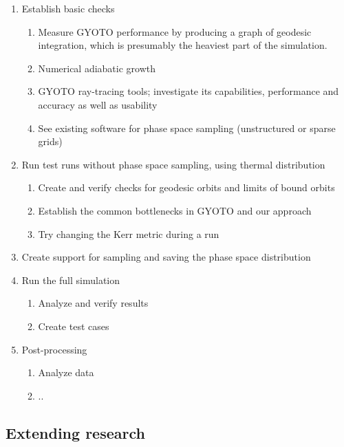 \documentclass[a4paper,10pt]{article}
\begin{document}
\begin{enumerate}
 \item Establish basic checks
 \begin{enumerate}
  \item Measure GYOTO performance by producing a graph of geodesic integration, which is presumably the heaviest part of the simulation.
  \item Numerical adiabatic growth \citep{Sadeghian_Ferrer_Will_2013}
  \item GYOTO ray-tracing tools; investigate its capabilities, performance and accuracy as well as usability
  \item See existing software for phase space sampling (unstructured or sparse grids)
 \end{enumerate}
 \item Run test runs without phase space sampling, using thermal distribution
 \begin{enumerate}
  \item Create and verify checks for geodesic orbits and limits of bound orbits
  \item Establish the common bottlenecks in GYOTO and our approach
  \item Try changing the Kerr metric during a run
 \end{enumerate}
 \item Create support for sampling and saving the phase space distribution
 \item Run the full simulation
 \begin{enumerate}
  \item Analyze and verify results
  \item Create test cases
 \end{enumerate}
 \item Post-processing
 \begin{enumerate}
  \item Analyze data
  \item ..
 \end{enumerate}
\end{enumerate}


\subsection{Extending research}

\end{document}
